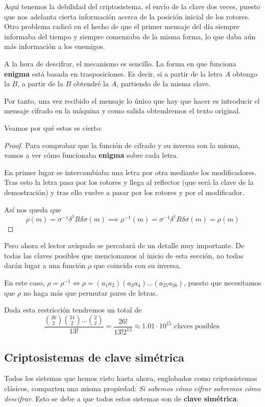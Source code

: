 Aquí tenemos la debilidad del criptosistema, el envío de la clave dos veces, puesto que nos adelanta cierta información acerca de la posición inicial de los rotores. Otro problema radicó en el hecho de que el primer mensaje del día siempre informaba del tiempo y siempre comenzaba de la misma forma, lo que daba aún más información a los enemigos.

A la hora de descifrar, el mecanismo es sencillo. La forma en que funciona \textbf{enigma} está basada en trasposiciones. Es decir, si a partir de la letra $A$ obtengo la $B$, a partir de la $B$ obtendré la $A$, partiendo de la misma clave.

Por tanto, una vez recibido el mensaje lo único que hay que hacer es introducir el mensaje cifrado en la máquina y como salida obtendremos el texto original.

Veamos por qué estos es cierto:
\begin{proof}
Para comprobar que la función de cifrado y su inversa son la misma, vamos a ver cómo funcionaba \textbf{enigma} sobre cada letra.

En primer lugar se intercambiaba una letra por otra mediante los modificadores. Tras esto la letra pasa por los rotores y llega al reflector (que será la clave de la demostración) y tras ello vuelve a pasar por los rotores y por el modificador.

Así nos queda que
\[\rho(m) = σ^{-1}δ^{1}Rδσ(m) \implies \rho^{-1}(m) = σ^{-1}δ^{1}Rδσ(m) = \rho(m)\]
\end{proof}

Pero ahora el lector avispado se percatará de un detalle muy importante. De todas las claves posibles que mencionamos al inicio de esta sección, no todas darán lugar a una función $\rho$ que coincida con su inversa.

En este caso, $\rho = \rho^{-1} \iff \rho = (a_1a_2)(a_3a_4)...(a_{25}a_{26})$, puesto que necesitamos que $\rho$ no haga más que permutar pares de letras.

Dada esta restricción tendremos un total de
\[\frac{{26 \choose 2} {24 \choose 2} ... {2 \choose 2}}{13!} =\frac{26!}{13!2^{13}} \approx 1.01 \cdot 10^{15} \text{ claves posibles }\]

\subsection{Criptosistemas de clave simétrica}
Todos los sistemas que hemos visto hasta ahora, englobados como criptosistemas clásicos, comparten una misma propiedad: \textit{Si sabemos cómo cifrar sabremos cómo descifrar}. Esto se debe a que todos estos sistemas son de \textbf{clave simétrica}.

